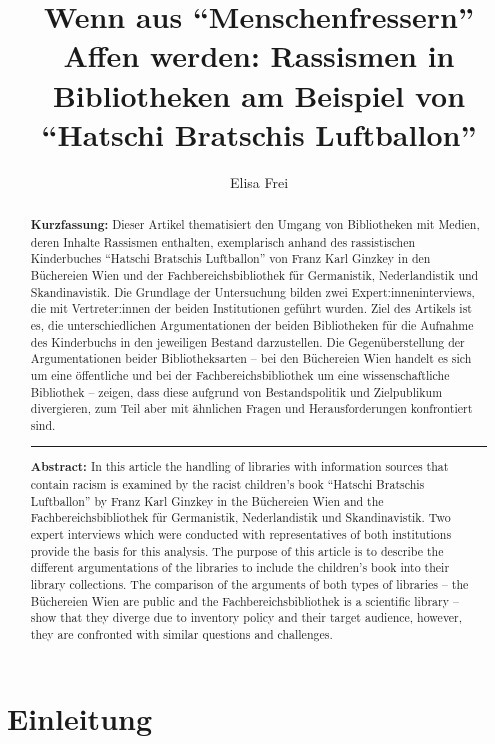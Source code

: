 \documentclass[a4paper,
fontsize=11pt,
oneside,
numbers=noperiodatend,
parskip=half-,
bibliography=totoc,
final
]{scrartcl}
\title{\LARGE{Wenn aus \enquote{Menschenfressern} Affen werden: Rassismen in Bibliotheken am Beispiel von \enquote{Hatschi Bratschis Luftballon}}}%
\author{Elisa Frei} %
\date{}
\begin{document}
\maketitle
\thispagestyle{fancyplain} 

\begin{abstract}
\noindent
\textbf{Kurzfassung:} Dieser Artikel thematisiert den Umgang von Bibliotheken mit
Medien, deren Inhalte Rassismen enthalten, exemplarisch anhand des
rassistischen Kinderbuches \enquote{Hatschi Bratschis Luftballon} von Franz
Karl Ginzkey in den Büchereien Wien und der Fachbereichsbibliothek für
Germanistik, Nederlandistik und Skandinavistik. Die Grundlage der
Untersuchung bilden zwei Expert:inneninterviews, die mit Vertreter:innen
der beiden Institutionen geführt wurden. Ziel des Artikels ist es, die
unterschiedlichen Argumentationen der beiden Bibliotheken für die
Aufnahme des Kinderbuchs in den jeweiligen Bestand darzustellen. Die
Gegenüberstellung der Argumentationen beider Bibliotheksarten -- bei den
Büchereien Wien handelt es sich um eine öffentliche und bei der
Fachbereichsbibliothek um eine wissenschaftliche Bibliothek -- zeigen,
dass diese aufgrund von Bestandspolitik und Zielpublikum divergieren,
zum Teil aber mit ähnlichen Fragen und Herausforderungen konfrontiert
sind.

\begin{center}\rule{0.5\linewidth}{0.5pt}\end{center}

\noindent \textbf{Abstract:} In this article the handling of libraries with information
sources that contain racism is examined by the racist children's book
\enquote{Hatschi Bratschis Luftballon} by Franz Karl Ginzkey in the Büchereien
Wien and the Fachbereichsbibliothek für Germanistik, Nederlandistik und
Skandinavistik. Two expert interviews which were conducted with
representatives of both institutions provide the basis for this
analysis. The purpose of this article is to describe the different
argumentations of the libraries to include the children's book into
their library collections. The comparison of the arguments of both types
of libraries -- the Büchereien Wien are public and the
Fachbereichsbibliothek is a scientific library -- show that they diverge
due to inventory policy and their target audience, however, they are
confronted with similar questions and challenges.
\end{abstract}

\hypertarget{einleitung}{%
\section{Einleitung}\label{einleitung}}
\end{document}
